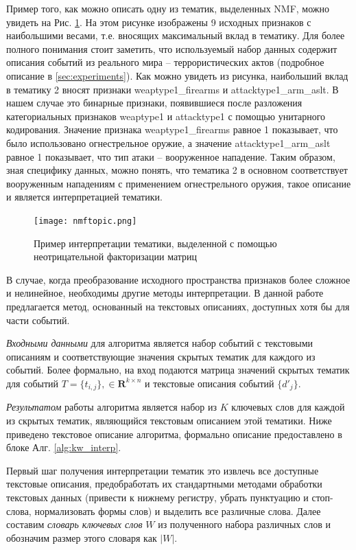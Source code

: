 Пример того, как можно описать одну из тематик, выделенных NMF, можно увидеть на Рис. \ref{fig:nmf_topic}. На этом рисунке изображены 9 исходных признаков с наибольшими весами, т.е. вносящих максимальный вклад в тематику. Для более полного понимания стоит заметить, что используемый набор данных содержит описания событий из реального мира -- террористических актов (подробное описание в \ref{sec:experiments}). Как можно увидеть из рисунка, наибольший вклад в тематику 2 вносят признаки weaptype1\_firearms и attacktype1\_arm\_aslt. В нашем случае это бинарные признаки, появившиеся после разложения категориальных признаков weaptype1 и attacktype1 с помощью унитарного кодирования. Значение признака weaptype1\_firearms равное 1 показывает, что было использовано огнестрельное оружие, а значение attacktype1\_arm\_aslt равное 1 показывает, что тип атаки -- вооруженное нападение. Таким образом, зная специфику данных, можно понять, что тематика 2 в основном соответствует вооруженным нападениям с применением огнестрельного оружия, такое описание и является интерпретацией тематики. 

\begin{figure}
  \centering
  \texttt{[image: nmftopic.png]}
  \caption{Пример интерпретации тематики, выделенной с помощью неотрицательной факторизации матриц}
  \label{fig:nmf_topic}
\end{figure}

В случае, когда преобразование исходного пространства признаков более сложное и нелинейное, необходимы другие методы интерпретации.
В данной работе предлагается метод, основанный на текстовых описаниях, доступных хотя бы для части событий.

\textit{Входными данными} для алгоритма является набор событий с текстовыми описаниям и соответствующие значения скрытых тематик для каждого из событий. Более формально, на вход подаются матрица значений скрытых тематик для событий  $T = \{t_{i,j}\}, \in \mathbf{R}^{k \times n}$ и текстовые описания событий $\{d'_j\}$.

\textit{Результатом} работы алгоритма является набор из $K$ ключевых слов для каждой из скрытых тематик, являющийся текстовым описанием этой тематики. Ниже приведено текстовое описание алгоритма, формально описание предоставлено в блоке Алг. \ref{alg:kw_interp}.

Первый шаг получения интерпретации тематик это извлечь все доступные текстовые описания, предобработать их стандартными методами обработки текстовых данных (привести к нижнему регистру, убрать пунктуацию и стоп-слова, нормализовать формы слов) и выделить все различные слова. Далее составим \textit{словарь ключевых слов} $W$ из полученного набора различных слов и обозначим размер этого словаря как $|W|$.

